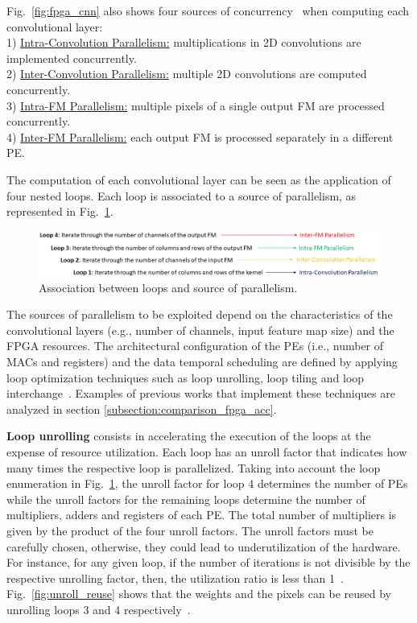 Fig.~\ref{fig:fpga_cnn} also shows four sources of concurrency~\cite{Abdelouahab:dnn_survey} when computing each convolutional layer:\\
1) \underline{Intra-Convolution Parallelism:} multiplications in 2D convolutions are implemented concurrently.\\
2) \underline{Inter-Convolution Parallelism:} multiple 2D convolutions are computed concurrently.\\
3) \underline{Intra-FM Parallelism:} multiple pixels of a single output FM are processed concurrently.\\
4) \underline{Inter-FM Parallelism:} each output FM is processed separately in a different PE.

The computation of each convolutional layer can be seen as the application of four nested loops. Each loop is associated to a source of parallelism, as represented in Fig.~\ref{fig:loop_parall}.

\begin{figure}[!htb]
  \centering
  \includegraphics[width=\textwidth]{Figures/loop_parall.png}
  \caption{Association between loops and source of parallelism.}
  \label{fig:loop_parall}
\end{figure}

The sources of parallelism to be exploited depend on the characteristics of the convolutional layers (e.g., number of channels, input feature map size) and the FPGA resources. The architectural configuration of the PEs (i.e., number of MACs and registers) and the data temporal scheduling are defined by applying loop optimization techniques such as loop unrolling, loop tiling and loop interchange~\cite{Abdelouahab:dnn_survey}. Examples of previous works that implement these techniques are analyzed in section \ref{subsection:comparison_fpga_acc}.\\

\vspace{-0.5cm}

\textbf{Loop unrolling} consists in accelerating the execution of the loops at the expense of resource utilization. Each loop has an unroll factor that indicates how many times the respective loop is parallelized. Taking into account the loop enumeration in Fig.~\ref{fig:loop_parall}, the unroll factor for loop 4 determines the number of PEs while the unroll factors for the remaining loops determine the number of multipliers, adders and registers of each PE. The total number of multipliers is given by the product of the four unroll factors. The unroll factors must be carefully chosen, otherwise, they could lead to underutilization of the hardware. For instance, for any given loop, if the number of iterations is not divisible by the respective unrolling factor, then, the utilization ratio is less than 1~\cite{Guo:dnn_survey}. Fig.~\ref{fig:unroll_reuse} shows that the weights and the pixels can be reused by unrolling loops 3 and 4 respectively~\cite{ma:loop_opt}.

